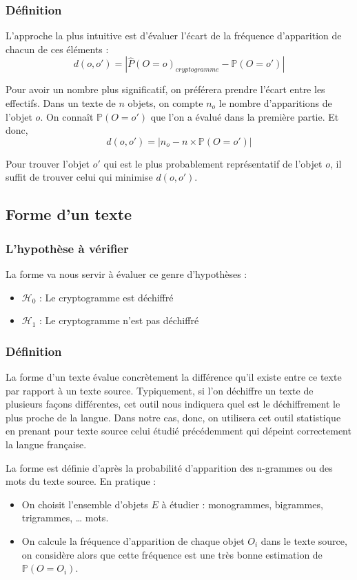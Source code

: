 \documentclass[a4paper, titlepage]{livret}
\begin{document}
\subsubsection{Définition}
L'approche la plus intuitive est d'évaluer l'écart de la fréquence d'apparition de chacun de ces éléments :
\[d(o, o') = |\hat{P}(O = o)_{cryptogramme} - \mathbb{P}(O = o')|\]

Pour avoir un nombre plus significatif, on préférera prendre l'écart entre les effectifs. 
Dans un texte de $n$ objets, on compte $n_{o}$ le nombre d'apparitions de l'objet $o$. 
On connaît $\mathbb{P}(O = o')$ que l'on a évalué dans la première partie.
Et donc, 
\[d(o, o') = |n_{o} - n\times \mathbb{P}(O = o')|\]

Pour trouver l'objet $o'$ qui est le plus probablement représentatif de l'objet $o$, il suffit de trouver celui qui minimise $d(o,o')$.

\subsection{Forme d'un texte}
\subsubsection{L'hypothèse à vérifier}
La forme va nous servir à évaluer ce genre d'hypothèses :
\begin{itemize}
 \item $\mathcal{H}_{0}$ : \og Le cryptogramme est déchiffré \fg{}
 \item $\mathcal{H}_{1}$  : \og Le cryptogramme n'est pas déchiffré \fg{}
\end{itemize}

\subsubsection{Définition}
La forme d'un texte évalue concrètement la différence qu'il existe entre ce texte par rapport à un texte source.
Typiquement, si l'on déchiffre un texte de plusieurs façons différentes, cet outil nous indiquera quel est le déchiffrement le plus proche de la langue.
Dans notre cas, donc, on utilisera cet outil statistique en prenant pour texte source celui étudié précédemment qui dépeint correctement la langue française.

La forme est définie d'après la probabilité d'apparition des n-grammes ou des mots du texte source.
En pratique :
\begin{itemize}
 \item On choisit l'ensemble d'objets $E$ à étudier : monogrammes, bigrammes, trigrammes, … mots.
 \item On calcule la fréquence d'apparition de chaque objet $O_{i}$ dans le texte source, on considère alors que cette fréquence est une très bonne estimation de $\mathbb{P}(O = O_{i})$.
\end{itemize}
\end{document}
